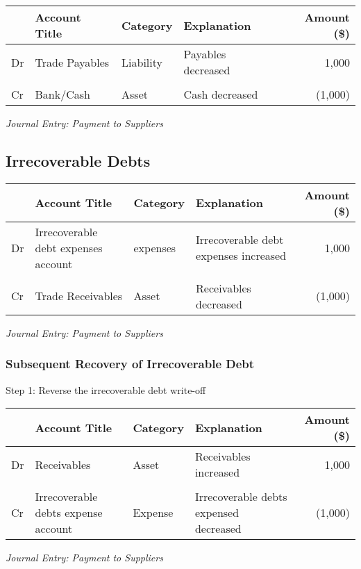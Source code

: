 \begin{center} 
\begin{tabular}{@{} l l l l r @{}}
\toprule
& \textbf{Account Title} & \textbf{Category} & \textbf{Explanation} & \textbf{Amount (\$)} \\
\midrule
Dr & Trade Payables & Liability & Payables decreased & 1,000 \\
 & \quad  & \\
Cr & Bank/Cash & Asset & Cash decreased & (1,000) \\
\bottomrule
\end{tabular}
\end{center}
\vspace{1em}
\textit{Journal Entry: Payment to Suppliers}


\subsection{Irrecoverable Debts}

\begin{center} 
\begin{tabular}{@{} l l l l r @{}}
\toprule
& \textbf{Account Title} & \textbf{Category} & \textbf{Explanation} & \textbf{Amount (\$)} \\
\midrule
Dr & Irrecoverable debt expenses account & expenses & Irrecoverable debt expenses increased & 1,000 \\
 & \quad  & \\
Cr & Trade Receivables & Asset & Receivables decreased & (1,000) \\
\bottomrule
\end{tabular}
\end{center}
\vspace{1em}
\textit{Journal Entry: Payment to Suppliers}

\subsubsection{Subsequent Recovery of Irrecoverable Debt}

Step 1: Reverse the irrecoverable debt write-off 

\begin{center} 
\begin{tabular}{@{} l l l l r @{}}
\toprule
& \textbf{Account Title} & \textbf{Category} & \textbf{Explanation} & \textbf{Amount (\$)} \\
\midrule
Dr & Receivables & Asset & Receivables increased & 1,000 \\
 & \quad  & \\
Cr & Irrecoverable debts expense account & Expense & Irrecoverable debts expensed decreased & (1,000) \\
\bottomrule
\end{tabular}
\end{center}
\vspace{1em}
\textit{Journal Entry: Payment to Suppliers}

